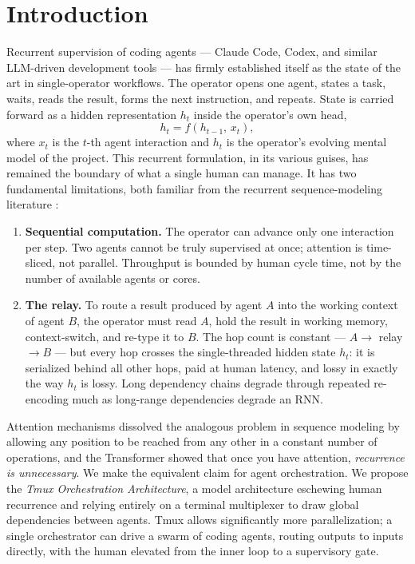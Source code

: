 \documentclass[10pt]{article}
\begin{document}
\section{Introduction}

Recurrent supervision of coding agents --- Claude Code, Codex, and similar LLM-driven
development tools --- has firmly established itself as the state of the art in
single-operator workflows. The operator opens one agent, states a task, waits, reads
the result, forms the next instruction, and repeats. State is carried forward as a
hidden representation $h_t$ inside the operator's own head,
\[
  h_t = f(h_{t-1},\, x_t),
\]
where $x_t$ is the $t$-th agent interaction and $h_t$ is the operator's evolving
mental model of the project. This recurrent formulation, in its various guises, has
remained the boundary of what a single human can manage. It has two fundamental
limitations, both familiar from the recurrent sequence-modeling literature
\cite{sutskever2014,bahdanau2015}:

\begin{enumerate}
\item \textbf{Sequential computation.} The operator can advance only one interaction
per step. Two agents cannot be truly supervised at once; attention is time-sliced,
not parallel. Throughput is bounded by human cycle time, not by the number of
available agents or cores.
\item \textbf{The relay.} To route a result produced by agent $A$ into the working
context of agent $B$, the operator must read $A$, hold the result in working memory,
context-switch, and re-type it to $B$. The hop count is constant --- $A \to$ relay
$\to B$ --- but every hop crosses the single-threaded hidden state $h_t$: it is
serialized behind all other hops, paid at human latency, and lossy in exactly the
way $h_t$ is lossy. Long dependency chains degrade through repeated re-encoding much
as long-range dependencies degrade an RNN.
\end{enumerate}

Attention mechanisms \cite{bahdanau2015} dissolved the analogous problem in sequence
modeling by allowing any position to be reached from any other in a constant number
of operations, and the Transformer \cite{vaswani2017} showed that once you have
attention, \emph{recurrence is unnecessary}. We make the equivalent claim for agent
orchestration. We propose the \emph{Tmux Orchestration Architecture}, a model
architecture eschewing human recurrence and relying entirely on a terminal
multiplexer to draw global dependencies between agents. Tmux allows significantly
more parallelization; a single orchestrator can drive a swarm of coding agents,
routing outputs to inputs directly, with the human elevated from the inner loop to a
supervisory gate.
\end{document}
